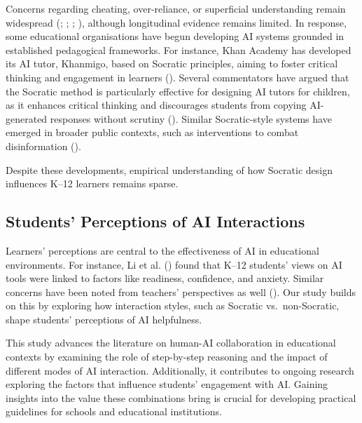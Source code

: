 \documentclass[
  11pt,
]{article}
\begin{document}
Concerns regarding cheating, over-reliance, or superficial understanding remain widespread (; ; ; ), although longitudinal evidence remains limited. In response, some educational organisations have begun developing AI systems grounded in established pedagogical frameworks. For instance, Khan Academy has developed its AI tutor, Khanmigo, based on Socratic principles, aiming to foster critical thinking and engagement in learners (). Several commentators have argued that the Socratic method is particularly effective for designing AI tutors for children, as it enhances critical thinking and discourages students from copying AI-generated responses without scrutiny (). Similar Socratic-style systems have emerged in broader public contexts, such as interventions to combat disinformation ().

Despite these developments, empirical understanding of how Socratic design influences K--12 learners remains sparse.

\subsection{Students' Perceptions of AI Interactions}\label{students-perceptions-of-ai-interactions}

Learners' perceptions are central to the effectiveness of AI in educational environments. For instance, Li et al. () found that K--12 students' views on AI tools were linked to factors like readiness, confidence, and anxiety. Similar concerns have been noted from teachers' perspectives as well (). Our study builds on this by exploring how interaction styles, such as Socratic vs.~non-Socratic, shape students' perceptions of AI helpfulness.

This study advances the literature on human-AI collaboration in educational contexts by examining the role of step-by-step reasoning and the impact of different modes of AI interaction. Additionally, it contributes to ongoing research exploring the factors that influence students' engagement with AI. Gaining insights into the value these combinations bring is crucial for developing practical guidelines for schools and educational institutions.
\end{document}
